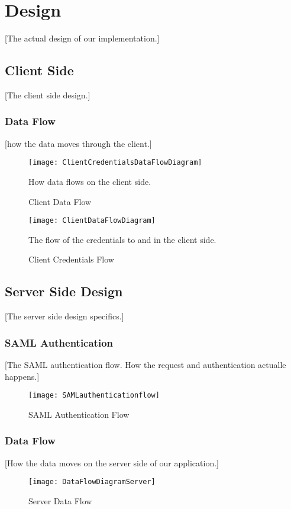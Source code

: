 \section{Design}\label{Design}
    [The actual design of our implementation.]
    \subsection{Client Side}\label{Client Side}
        [The client side design.]
        \subsubsection{Data Flow}\label{Data Flow}
        [how the data moves through the client.]
            \begin{figure}[h]
            \centering
            \texttt{[image: ClientCredentialsDataFlowDiagram]}
            \caption{Client Data Flow}
            How data flows on the client side.
            \label{fig:ClientCredentialsDataFlowDiagram}
        \end{figure}
        
        \begin{figure}[h]
            \centering
            \texttt{[image: ClientDataFlowDiagram]}
            \caption{Client Credentials Flow}
            The flow of the credentials to and in the client side.
            \label{fig:ClientDataFlowDiagram}
        \end{figure}
        
    \subsection{Server Side Design}\label{Server Side Design}
        [The server side design specifics.]
        \subsubsection{SAML Authentication}\label{SAML Authentication}
            [The SAML authentication flow. How the request and authentication actualle happens.]
            \begin{figure}[h]
                \centering
                \texttt{[image: SAMLauthenticationflow]}
                \caption{SAML Authentication Flow}
                \label{fig:SAMLauthenticationflow}
            \end{figure}
        
        \subsubsection{Data Flow}\label{serverdataflow}
            [How the data moves on the server side of our application.]
            \begin{figure}[h]
                \centering
                \texttt{[image: DataFlowDiagramServer]}
                \caption{Server Data Flow}
                \label{fig:serverDataFlow}
            \end{figure}

